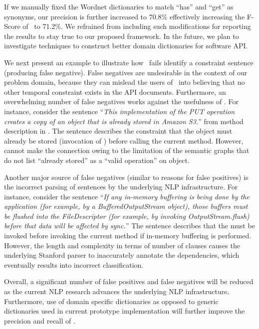 If we manually fixed the Wordnet dictionaries to match ``has'' and ``get'' as synonyms, our precision is further increased to 70.8\% effectively increasing the F-Score of \tool\ to 71.2\%. We refrained from including such modifications for reporting the results to stay true to our proposed framework. In the future, we plan to investigate techniques to construct better domain dictionaries for software API.

We next present an example to illustrate how \tool\ fails identify a constraint sentence (producing false negative). False negatives are undesirable in the context of our problem domain, because they can mislead the users of \tool\ into believing that no other temporal constraint exists in the API documents. Furthermore, an overwhelming number of false negatives works against the usefulness of \tool. For instance, consider the sentence ``\textit{This implementation of the PUT operation creates a copy of an object that is already stored in Amazon S3.}'' from   method description in \amazonAPI. The sentence describes the constraint that the object must already be stored (invocation of ) before calling the current method. However, \tool cannot make the connection owing to the limitation of the semantic graphs that do not list ``already stored'' as a ``valid operation'' on object.  


Another major source of false negatives (similar to reasons for false positives) is the incorrect parsing of sentences by the underlying NLP infrastructure. For instance, consider the sentence ``\textit{If any in-memory buffering is being done by the application (for example, by a BufferedOutputStream object), those buffers must be flushed into the FileDescriptor (for example, by invoking OutputStream.flush) before that data will be affected by sync.}'' The sentence describes that the  must be invoked before invoking the current method if in-memory buffering is performed. However, the length and complexity in terms of number of clauses causes the underlying Stanford parser to inaccurately annotate the dependencies, which eventually results into incorrect classification. 

Overall, a significant number of false positives and false negatives will be reduced as the current NLP research advances the underlying NLP infrastructure. Furthermore, use of domain specific dictionaries as opposed to generic dictionaries used in current prototype implementation will further improve the precision and recall of \tool. 

